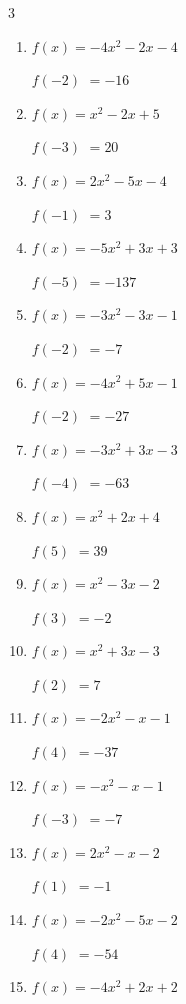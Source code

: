 \begin{multicols}{3}
\begin{enumerate}
$f(-3)$
        $= 1$

\columnbreak %

\resetques

  \item $f(x)=-4x^{2}-2x-4$

$f(-2)$
        $= -16$

  \item $f(x)=x^{2}-2x+5$

$f(-3)$
        $= 20$

  \item $f(x)=2x^{2}-5x-4$

$f(-1)$
        $= 3$

  \item $f(x)=-5x^{2}+3x+3$

$f(-5)$
        $= -137$

  \item $f(x)=-3x^{2}-3x-1$

$f(-2)$
        $= -7$

  \item $f(x)=-4x^{2}+5x-1$

$f(-2)$
        $= -27$

  \item $f(x)=-3x^{2}+3x-3$

$f(-4)$
        $= -63$

  \item $f(x)=x^{2}+2x+4$

$f(5)$
        $= 39$

  \item $f(x)=x^{2}-3x-2$

$f(3)$
        $= -2$

  \item $f(x)=x^{2}+3x-3$

$f(2)$
        $= 7$

  \item $f(x)=-2x^{2}-x-1$

$f(4)$
        $= -37$

  \item $f(x)=-x^{2}-x-1$

$f(-3)$
        $= -7$

  \item $f(x)=2x^{2}-x-2$

$f(1)$
        $= -1$

  \item $f(x)=-2x^{2}-5x-2$

$f(4)$
        $= -54$

  \item $f(x)=-4x^{2}+2x+2$


\end{enumerate}
\end{multicols}
